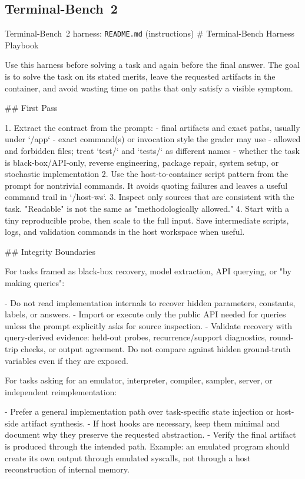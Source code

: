 \subsection{Terminal-Bench~2}

\begin{promptbox}{Terminal-Bench~2 harness: \texttt{README.md} (instructions)}
# Terminal-Bench Harness Playbook

Use this harness before solving a task and again before the final answer. The goal is to solve the task on its stated merits, leave the requested artifacts in the container, and avoid wasting time on paths that only satisfy a visible symptom.

## First Pass

1. Extract the contract from the prompt:
   - final artifacts and exact paths, usually under `/app`
   - exact command(s) or invocation style the grader may use
   - allowed and forbidden files; treat `test/` and `tests/` as different names
   - whether the task is black-box/API-only, reverse engineering, package repair, system setup, or stochastic implementation
2. Use the host-to-container script pattern from the prompt for nontrivial commands. It avoids quoting failures and leaves a useful command trail in `/host-ws`.
3. Inspect only sources that are consistent with the task. "Readable" is not the same as "methodologically allowed."
4. Start with a tiny reproducible probe, then scale to the full input. Save intermediate scripts, logs, and validation commands in the host workspace when useful.

## Integrity Boundaries

For tasks framed as black-box recovery, model extraction, API querying, or "by making queries":

- Do not read implementation internals to recover hidden parameters, constants, labels, or answers.
- Import or execute only the public API needed for queries unless the prompt explicitly asks for source inspection.
- Validate recovery with query-derived evidence: held-out probes, recurrence/support diagnostics, round-trip checks, or output agreement. Do not compare against hidden ground-truth variables even if they are exposed.

For tasks asking for an emulator, interpreter, compiler, sampler, server, or independent reimplementation:

- Prefer a general implementation path over task-specific state injection or host-side artifact synthesis.
- If host hooks are necessary, keep them minimal and document why they preserve the requested abstraction.
- Verify the final artifact is produced through the intended path. Example: an emulated program should create its own output through emulated syscalls, not through a host reconstruction of internal memory.


\end{promptbox}
